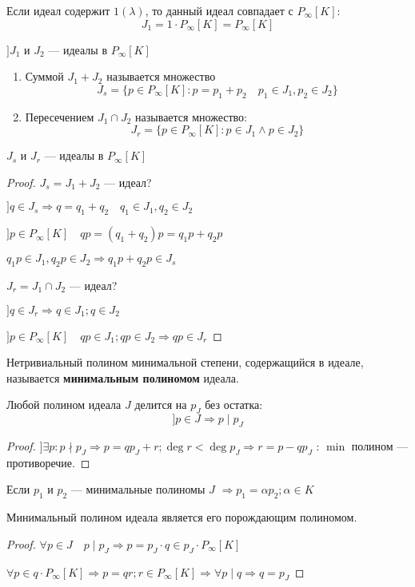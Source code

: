 \begin{remark}
    Если идеал содержит $1(\lambda)$, то данный идеал совпадает с $P_\infty[K]$:
    $$J_1=1\cdot P_\infty[K]=P_\infty[K]$$
\end{remark}
\begin{definition}
    $] J_1$ и $J_2$ --- идеалы в $P_\infty[K]$
    \begin{enumerate}
        \item Суммой $J_1 + J_2$ называется множество
        $$J_s=\{p\in P_\infty[K] : p = p_1 + p_2 \quad p_1\in J_1, p_2\in J_2\}$$
        \item Пересечением $J_1 \cap J_2$ называется множество:
        $$J_r=\{p\in P_\infty[K] : p\in J_1 \wedge p\in J_2\}$$
    \end{enumerate}
\end{definition}
\begin{lemma}
    $J_s$ и $J_r$ --- идеалы в $P_\infty[K]$
\end{lemma}
\begin{proof}
    $J_s=J_1+J_2$ --- идеал?

    $] q\in J_s \Rightarrow q=q_1+q_2 \quad q_1\in J_1, q_2\in J_2$

    $] p\in P_\infty[K] \quad qp = (q_1+q_2)p=q_1p+q_2p$

    $q_1p \in J_1, q_2p \in J_2 \Rightarrow q_1p+q_2p\in J_s$

    $J_r=J_1\cap J_2$ --- идеал?

    $] q\in J_r \Rightarrow q\in J_1; q\in J_2$

    $] p\in P_\infty[K] \quad qp \in J_1; qp\in J_2 \Rightarrow qp \in J_r$
\end{proof}

\begin{definition}
    Нетривиальный полином минимальной степени, содержащийся в идеале, называется \textbf{минимальным полиномом} идеала.
\end{definition}
\begin{lemma}
    Любой полином идеала $J$ делится на $p_J$ без остатка:
    $$] p\in J \Rightarrow p\mid p_J$$
\end{lemma}
\begin{proof}
    $] \exists p : p\nmid p_J \Rightarrow p=qp_J+r; \deg r < \deg p_J \Rightarrow r=p-qp_J$ : $\min$ полином --- противоречие.
\end{proof}
\begin{remark}
    Если $p_1$ и $p_2$ --- минимальные полиномы $J$ $\Rightarrow p_1=\alpha p_2; \alpha\in K$
\end{remark}
\begin{theorem}
    Минимальный полином идеала является его порождающим полиномом.
\end{theorem}
\begin{proof}
    $\forall p\in J \quad p\mid p_J\Rightarrow p=p_J\cdot q\in p_J\cdot P_\infty[K]$

    $\forall p\in q\cdot P_\infty[K] \Rightarrow p=qr; r\in P_\infty[K] \Rightarrow \forall p\mid q \Rightarrow q=p_J$
\end{proof}

